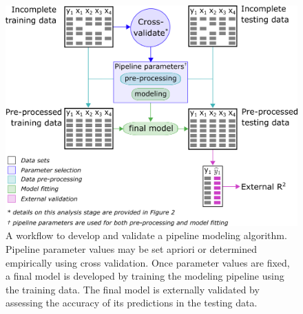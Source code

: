 \documentclass[AMA,STIX1COL,doublespace]{WileyNJD-v2}
\begin{document}
\begin{figure}
\includegraphics[width=1\linewidth]{figs/workflow_ML} 
\caption{A workflow to develop and validate a pipeline modeling algorithm. Pipeline parameter values may be set apriori or determined empirically using cross validation. Once parameter values are fixed, a final model is developed by training the modeling pipeline using the training data. The final model is externally validated by assessing the accuracy of its predictions in the testing data.}
\label{fig:workflow_ml}
\end{figure}

\FloatBarrier
\end{document}
